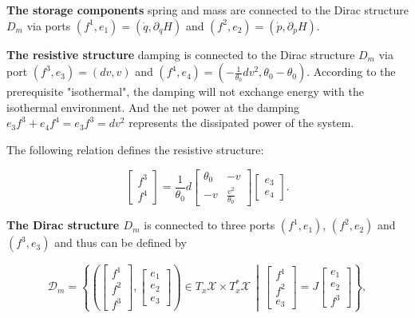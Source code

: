 \documentclass[
	parskip, 			   %
	twoside, 			   %
	DIV=14, 			   %
	BCOR=15.0mm, 		   %
	headsepline, 		   %
	open=right, 		   %
	captions=tableheading, %
	bibliography=totoc,    %
	numbers=noenddot       %
]{scrreprt}
\begin{document}
\textbf{The storage components} spring and mass are connected to the Dirac structure $D_m$ via ports $(f^1, e_1) = (\dot{q}, \partial_q H)$ and $(f^2, e_2) = (\dot{p}, \partial_p H)$.

\textbf{The resistive structure} damping is connected to the Dirac structure $D_m$ via port $(f^3, e_3) = (dv, v)$ and $(f^4, e_4) = (-\frac{1}{\theta_{0}}dv^2, \theta_{0}-\theta_{0})$. According to the prerequisite "isothermal", the damping will not exchange energy with the isothermal environment. And the net power at the damping $e_3 f^3 + e_4 f^4 = e_3 f^3 = dv^2$ represents the dissipated power of the system.

The following relation defines the resistive structure:

\begin{equation}
    \label{eq:resistive_structure_idho}
    \left[\begin{array}{l}f^3 \\ f^4\end{array}\right]=\frac{1}{\theta_0} d\left[\begin{array}{rr}\theta_0 & -v \\ -v & \frac{v^2}{\theta_0}\end{array}\right]\left[\begin{array}{l}e_3 \\ e_4\end{array}\right].
\end{equation}

\textbf{The Dirac structure $D_m$} is connected to three ports $(f^1, e_1)$, $(f^2, e_2)$ and $(f^3, e_3)$ and thus can be defined by

\begin{equation}
    \label{eq:Dirac_structure_idho}
    \mathcal{D}_m=\left\{ \left( \left[\begin{array}{l}f^1 \\ f^2 \\ \hline f^3 \end{array} \right], \left[\begin{array}{l} e_1 \\ e_2 \\ \hline e_3 \end{array}\right] \right) \in T_{x}\mathcal{X} \times T_{x}^{*}\mathcal{X}    \,\middle\vert\,    \left[\begin{array}{l}f^1 \\ f^2 \\ \hline e_3\end{array}\right]=J\left[\begin{array}{l}e_1 \\ e_2 \\ \hline f^3 \end{array}\right]\right\},
\end{equation}
\end{document}

